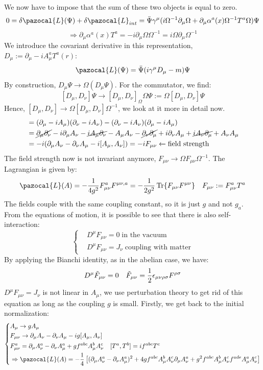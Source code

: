 \documentclass[../main.tex]{subfiles}
\begin{document}
We now have to impose that the sum of these two objects is equal to zero.
\[
0=\delta\pazocal{L}(\Psi)+\delta\pazocal{L}_{int}=\Bar{\Psi}\gamma^\mu(i\Omega^{-1}\partial_\mu\Omega+\partial_\mu\alpha^a(x)\Omega^{-1}T^a\Omega)\Psi
\]
\[
\Rightarrow\partial_\mu\alpha^a(x)T^a=-i\partial_\mu\Omega\Omega^{-1}=i\Omega\partial_\mu\Omega^{-1}
\]
We introduce the covariant derivative in this representation,\\
$D_\mu:=\partial_\mu-iA_\mu^a T^a(r)$:
\[
\pazocal{L}(\Psi)=\Bar{\Psi}(i\gamma^\mu D_\mu-m)\Psi
\]
By construction, $D_\mu\Psi\to\Omega(D_\mu\Psi)$. For the commutator, we find:
\[
[D_\mu,D_\nu]\Psi\to[D_\mu,D_\nu]_\Omega\Omega\Psi:=\Omega[D_\mu,D_\nu]\Psi
\]
Hence, $[D_\mu,D_\nu]\to\Omega[D_\mu,D_\nu]\Omega^{-1}$, we look at it more in detail now.
\begin{align*}
[D_\mu,D_\nu]&=(\partial_\mu-iA_\mu)(\partial_\nu-iA_\nu)-(\partial_\nu-iA_\nu)(\partial_\mu-iA_\mu)\\
&=\cancel{\partial_\mu\partial_\nu}-i\partial_\mu A_\nu-\cancel{iA_\mu\partial_\nu}-A_\mu A_\nu-\cancel{\partial_\nu\partial_\mu}+i\partial_\nu A_\mu+\cancel{iA_\nu\partial_\mu}+A_\nu A_\mu\\
&=-i(\partial_\mu A_\nu-\partial_\nu A_\mu-i[A_\mu,A_\nu])=-iF_{\mu\nu}\xleftarrow[]{}\text{field strength}
\end{align*}
The field strength now is not invariant anymore, $F_{\mu\nu}\to\Omega F_{\mu\nu}\Omega^{-1}$. The Lagrangian is given by:
\[
\pazocal{L}(A)=-\frac{1}{4g^2}F_{\mu\nu}^aF^{\mu\nu,a}=-\frac{1}{2g^2}\Tr{F_{\mu\nu}F^{\mu\nu}} \quad F_{\mu\nu}:=F_{\mu\nu}^aT^a
\]
The fields couple with the same coupling constant, so it is just $g$ and not $g_a$. From the equations of motion, it is possible to see that there is also self-interaction:
\[
\left\{
\begin{aligned}
&D^\mu F_{\mu\nu}=0\;\text{in the vacuum}\\
&D^\mu F_{\mu\nu}=J_\nu\;\text{coupling with matter}
\end{aligned}
\right.
\]
By applying the Bianchi identity, as in the abelian case, we have:
\[
D^\mu\Tilde{F}_{\mu\nu}=0 \quad \Tilde{F}_{\mu\nu}=\frac{1}{2}\epsilon_{\mu\nu\rho\sigma}F^{\rho\sigma}
\]
$D^\mu F_{\mu\nu}=J_\nu$ is not linear in $A_\mu$, we use perturbation theory to get rid of this equation as long as the coupling $g$ is small. Firstly, we get back to the initial normalization:
\[
\left\{
\begin{aligned}
&A_\mu\to gA_\mu\\
&F_{\mu\nu}\to\partial_\mu A_\nu-\partial_\nu A_\mu-ig[A_\mu,A_\nu]\\
&F_{\mu\nu}^a=\partial_\mu A_\nu^a-\partial_\nu A_\mu^a+gf^{abc}A_\mu^bA_\nu^c \quad [T^a,T^b]=if^{abc}T^c\\
&\Rightarrow\pazocal{L}(A)=-\frac{1}{4}\left[(\partial_\mu A_\nu^a-\partial_\nu A_\mu^a)^2+4gf^{abc}A_\mu^bA_\nu^c\partial_\mu A_\nu^a+g^2f^{abc}A_\mu^bA_\nu^cf^{ade}A_\mu^aA_\nu^c\right]
\end{aligned}
\right.
\]
\end{document}
